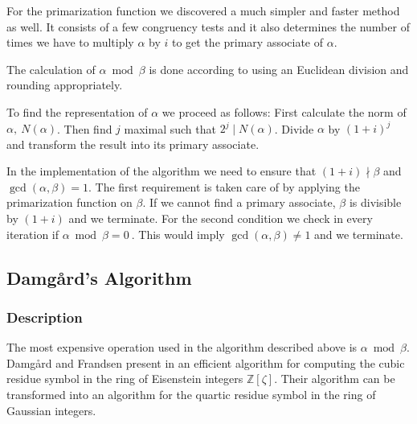 \documentclass[a4paper, 11pt]{article}
\begin{document}
 For the primarization function we discovered a much simpler and faster method as well. It consists of a few congruency tests and it also determines the number of times we have to multiply $\alpha$ by $i$ to get the primary associate of $\alpha$. 
 
 The calculation of $\alpha \bmod \beta$ is done according to \cite{lefevre} using an Euclidean division and rounding appropriately. 
 
 To find the representation of $\alpha$ we proceed as follows: First calculate the norm of 
 $\alpha, ~N(\alpha)$. Then find $j$ maximal such that $2^{j} \mid N(\alpha)$. Divide $\alpha$ by $(1+i)^j$ and transform  the result into its  primary associate. 
 
 In the implementation of the algorithm we need to ensure that $(1 + i) \nmid \beta$ and $\gcd(\alpha,\beta)=1$. The first requirement is taken care of by applying the primarization function on $\beta$. If we cannot find a primary associate, $\beta$ is divisible by $(1+i)$ and we terminate. 
 For the second condition we check in every iteration if $\alpha \bmod \beta = 0~$. This would imply $\gcd(\alpha,\beta) 
 \ne 1$ and we terminate. 
 
 \subsection{Damg\aa rd's Algorithm} 
 \subsubsection{Description} 
 The most expensive operation used in the algorithm described above is $\alpha \bmod \beta$. Damg\aa rd and Frandsen present 
 in \cite{damgard} an efficient algorithm for computing the cubic residue symbol in the ring of Eisenstein integers 
 $\mathbb{Z}[{\zeta}]$. Their algorithm can be transformed into an algorithm for the quartic residue symbol in the ring 
 of Gaussian integers. 
 
\end{document}
